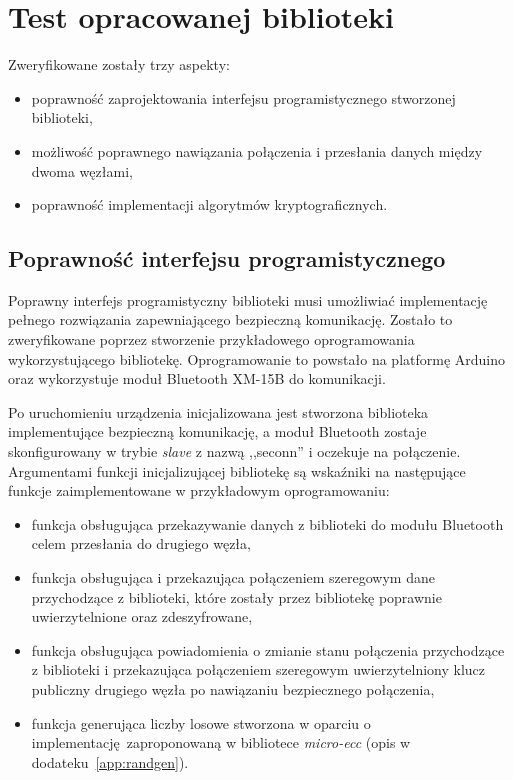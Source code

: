 \chapter{Test opracowanej biblioteki}
\label{cha:walidacja}

Zweryfikowane zostały trzy aspekty:

\begin{itemize}
\item poprawność zaprojektowania interfejsu programistycznego stworzonej biblioteki,
\item możliwość poprawnego nawiązania połączenia i przesłania danych między dwoma węzłami,
\item poprawność implementacji algorytmów kryptograficznych.
\end{itemize}

\section{Poprawność interfejsu programistycznego}

Poprawny interfejs programistyczny biblioteki musi umożliwiać implementację pełnego rozwiązania zapewniającego bezpieczną komunikację. Zostało to zweryfikowane poprzez stworzenie przykładowego oprogramowania wykorzystującego bibliotekę. Oprogramowanie to powstało na platformę Arduino oraz wykorzystuje moduł Bluetooth XM-15B do komunikacji.

Po uruchomieniu urządzenia inicjalizowana jest stworzona biblioteka implementujące bezpieczną komunikację, a moduł Bluetooth zostaje skonfigurowany w trybie \emph{slave} z nazwą ,,seconn'' i oczekuje na połączenie. Argumentami funkcji inicjalizującej bibliotekę są wskaźniki na następujące funkcje zaimplementowane w przykładowym oprogramowaniu:

\begin{itemize}
    \item funkcja obsługująca przekazywanie danych z biblioteki do modułu Bluetooth celem przesłania do drugiego węzła,
    \item funkcja obsługująca i przekazująca połączeniem szeregowym dane przychodzące z biblioteki, które zostały przez bibliotekę poprawnie uwierzytelnione oraz zdeszyfrowane,
    \item funkcja obsługująca powiadomienia o zmianie stanu połączenia przychodzące z biblioteki i przekazująca połączeniem szeregowym uwierzytelniony klucz publiczny drugiego węzła po nawiązaniu bezpiecznego połączenia,
    \item funkcja generująca liczby losowe stworzona w oparciu o implementację zaproponowaną w bibliotece {\itshape micro-ecc} (opis w dodateku~\ref{app:randgen}).
\end{itemize}

